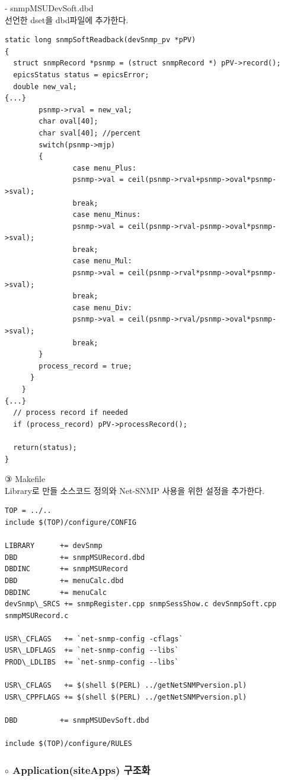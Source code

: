\documentclass[11pt
  , a4paper
  , article
  , oneside
]{memoir}
\begin{document}
- snmpMSUDevSoft.dbd\\
선언한 dset을 dbd파일에 추가한다.\\
{\scriptsize
\begin{lstlisting}[style=termstyle]
static long snmpSoftReadback(devSnmp_pv *pPV)
{
  struct snmpRecord *psnmp = (struct snmpRecord *) pPV->record();
  epicsStatus status = epicsError;
  double new_val;
{...}
        psnmp->rval = new_val;
        char oval[40]; 
        char sval[40]; //percent
        switch(psnmp->mjp)
        {
                case menu_Plus: 
                psnmp->val = ceil(psnmp->rval+psnmp->oval*psnmp->sval);
                break;
                case menu_Minus: 
                psnmp->val = ceil(psnmp->rval-psnmp->oval*psnmp->sval);
                break;
                case menu_Mul: 
                psnmp->val = ceil(psnmp->rval*psnmp->oval*psnmp->sval);
                break;
                case menu_Div: 
                psnmp->val = ceil(psnmp->rval/psnmp->oval*psnmp->sval);
                break;
        }
        process_record = true;
      }
    }
{...}
  // process record if needed
  if (process_record) pPV->processRecord();

  return(status);
}
\end{lstlisting}
}

\hfill

③ Makefile\\
Library로 만들 소스코드 정의와 Net-SNMP 사용을 위한 설정을 추가한다.\\
{\scriptsize
\begin{lstlisting}[style=termstylenumber]
TOP = ../..
include $(TOP)/configure/CONFIG

LIBRARY      += devSnmp  
DBD          += snmpMSURecord.dbd
DBDINC       += snmpMSURecord
DBD          += menuCalc.dbd
DBDINC       += menuCalc
devSnmp\_SRCS += snmpRegister.cpp snmpSessShow.c devSnmpSoft.cpp snmpMSURecord.c

USR\_CFLAGS   += `net-snmp-config -cflags`
USR\_LDFLAGS  += `net-snmp-config --libs`
PROD\_LDLIBS  += `net-snmp-config --libs`

USR\_CFLAGS   += $(shell $(PERL) ../getNetSNMPversion.pl)
USR\_CPPFLAGS += $(shell $(PERL) ../getNetSNMPversion.pl)

DBD          += snmpMSUDevSoft.dbd

include $(TOP)/configure/RULES
\end{lstlisting}
}

\hfill

\subsubsection{$ \circ $ Application(siteApps) 구조화}
\end{document}
